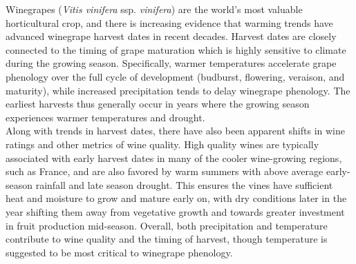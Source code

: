 \documentclass[final]{nature}
\begin{document}
\noindent Winegrapes (\emph{Vitis vinifera} ssp. \emph{vinifera}) are the world's most valuable horticultural crop, and there is increasing evidence that warming trends have advanced winegrape harvest dates in recent decades\cite{Duchene:2005bd,Jones:2000br,schultzjones,Seguin2005,tomasi2011,odo2012,webb2012}. Harvest dates are closely connected to the timing of grape maturation which is highly sensitive to climate during the growing season. Specifically, warmer temperatures accelerate grape phenology over the full cycle of development (budburst, flowering, veraison, and maturity), while increased precipitation tends to delay winegrape phenology\cite{jones2013}. The earliest harvests thus generally occur in years where the growing season experiences warmer temperatures and drought\cite{Jones:2000br}.\\
\indent Along with trends in harvest dates, there have also been apparent shifts in wine ratings\cite{jones2005} and other metrics of wine quality\cite{Jones:2000br,mori2007}. High quality wines are typically associated with early harvest dates in many of the cooler wine-growing regions, such as France\cite{Jones:2000br,jones2005}, and are also favored by warm summers with above average early-season rainfall and late season drought. This ensures the vines have sufficient heat and moisture to grow and mature early on, with dry conditions later in the year shifting them away from vegetative growth and towards greater investment in fruit production mid-season\cite{chaves2010,jones2013,baciocco2014}. Overall, both precipitation\cite{vanlee2009} and temperature\cite{baciocco2014} contribute to wine quality and the timing of harvest\cite{odo2012,webb2012}, though temperature is suggested to be most critical to winegrape phenology\cite{coombe1987,jones2005}.\\
\end{document}
